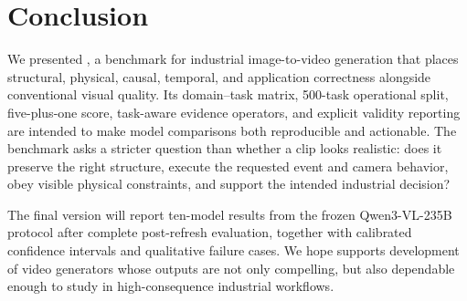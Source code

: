 \section{Conclusion}
\label{sec:conclusion}

We presented \FORGE, a benchmark for industrial image-to-video generation that places structural, physical, causal, temporal, and application correctness alongside conventional visual quality. Its domain--task matrix, 500-task operational split, five-plus-one score, task-aware evidence operators, and explicit validity reporting are intended to make model comparisons both reproducible and actionable. The benchmark asks a stricter question than whether a clip looks realistic: does it preserve the right structure, execute the requested event and camera behavior, obey visible physical constraints, and support the intended industrial decision?

The final version will report ten-model results from the frozen Qwen3-VL-235B protocol after complete post-refresh evaluation, together with calibrated confidence intervals and qualitative failure cases. We hope \FORGE{} supports development of video generators whose outputs are not only compelling, but also dependable enough to study in high-consequence industrial workflows.
